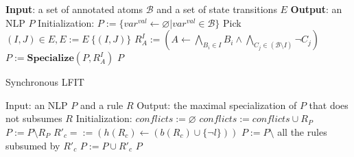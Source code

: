 \begin{algorithm}[ht]
\begin{algorithmic}
    \State \textbf{Input}: a set of annotated atoms $\mathcal{B}$ and a set of state transitions $E$
    \State \textbf{Output}: an NLP $P$
    \State Initialization: $P:= \{var^{val}\gets\varnothing|var^{val}\in \mathcal{B}\}$
        \State Pick $(I,J)\in E,E:= E \ \{(I,J)\}$
            \State $R_A^I:= (A\gets\underset{B_i\in I}{\bigwedge}B_i\land \underset{C_j\in (\mathcal{B}\setminus I)}{\bigwedge}\lnot C_j)$
            \State $P:= \mathbf{Specialize}(P,R_A^I)$
        \EndFor
    \EndWhile
    \State\Return $P$
\end{algorithmic}
\caption{Synchronous LFIT}\label{alg:syncLFIT}
\end{algorithm}

\begin{algorithm}[ht]
\begin{algorithmic}
    \State Input: an NLP $P$ and a rule $R$
    \State Output: the maximal specialization of $P$ that does not subsumes $R$
    \State Initialization: $conflicts := \varnothing$
    \State{\textcolor{gray}{// Search rules that need to be specialized}}
            \State $conflicts := conflicts\cup R_P$
            \State $P := P \setminus R_P$
        \EndIf
    \EndFor
    \State{\textcolor{gray}{// Revise the rules by least specialization}}
                \State $R'_c=:= (h(R_c) \gets (b(R_c) \cup \{\lnot l\}))$
                    \State $P := P \setminus$ all the rules subsumed by $R'_c$
                    \State $P := P \cup R'_c$
                \EndIf
            \EndIf
        \EndFor
    \EndFor
    \State\Return $P$
\end{algorithmic}
\caption{\textbf{Specialize} in synchronous LFIT algorithm%
}\label{alg:specializeLFIT}
\end{algorithm}


